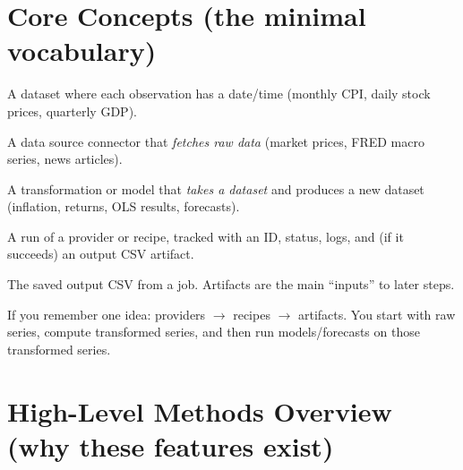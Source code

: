 \documentclass[11pt,a4paper]{article}
\begin{document}
\section{Core Concepts (the minimal vocabulary)}

\begin{description}[leftmargin=2.5em, style=nextline]
  \item[Time series] A dataset where each observation has a date/time (monthly CPI, daily stock prices, quarterly GDP).
  \item[Provider] A data source connector that \textit{fetches raw data} (market prices, FRED macro series, news articles).
  \item[Recipe] A transformation or model that \textit{takes a dataset} and produces a new dataset (inflation, returns, OLS results, forecasts).
  \item[Job] A run of a provider or recipe, tracked with an ID, status, logs, and (if it succeeds) an output CSV artifact.
  \item[Artifact] The saved output CSV from a job. Artifacts are the main ``inputs'' to later steps.
\end{description}

\begin{intuitionbox}
If you remember one idea: providers \(\rightarrow\) recipes \(\rightarrow\) artifacts. You start with raw series, compute transformed series, and then run models/forecasts on those transformed series.
\end{intuitionbox}

\section{High-Level Methods Overview (why these features exist)}
\end{document}
